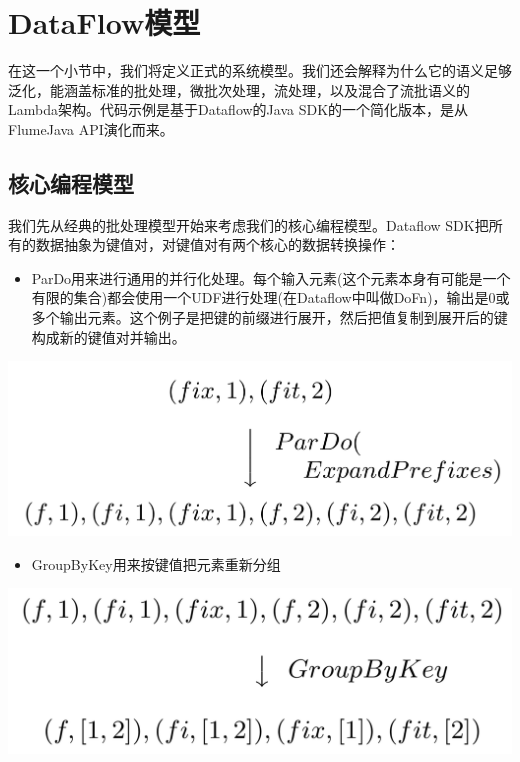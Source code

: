 \documentclass[oneside]{ctexbook}
\begin{document}
\section{DataFlow模型}

在这一个小节中，我们将定义正式的系统模型。我们还会解释为什么它的语义足够泛化，能涵盖标准的批处理，微批次处理，流处理，以及混合了流批语义的Lambda架构。代码示例是基于Dataflow的Java SDK的一个简化版本，是从FlumeJava API演化而来。

\subsection{核心编程模型}

我们先从经典的批处理模型开始来考虑我们的核心编程模型。Dataflow SDK把所有的数据抽象为键值对，对键值对有两个核心的数据转换操作：

\begin{itemize}
\item ParDo用来进行通用的并行化处理。每个输入元素(这个元素本身有可能是一个有限的集合)都会使用一个UDF进行处理(在Dataflow中叫做DoFn)，输出是0或多个输出元素。这个例子是把键的前缀进行展开，然后把值复制到展开后的键构成新的键值对并输出。
\end{itemize}

\noindent \includegraphics[width=\textwidth]{pardo.png}

\begin{itemize}
\item GroupByKey用来按键值把元素重新分组
\end{itemize}

\noindent \includegraphics[width=\textwidth]{groupbykey.png}
\end{document}
